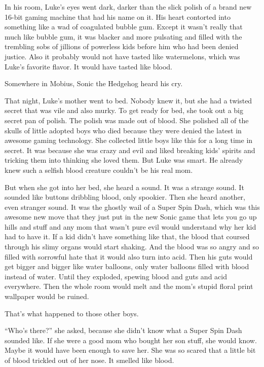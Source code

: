 In his room, Luke's eyes went dark, darker than the slick
polish of a brand new 16-bit gaming machine that had his name on
it. His heart contorted into something like a wad of coagulated
bubble gum. Except it wasn't really that much like bubble
gum, it was blacker and more pulsating and filled with the
trembling sobs of jillions of powerless kids before him who had
been denied justice. Also it probably would not have tasted like
watermelons, which was Luke's favorite flavor. It would have
tasted like blood.



Somewhere in Mobius, Sonic the Hedgehog heard his cry.



That night, Luke's mother went to bed. Nobody knew it, but
she had a twisted secret that was vile and also murky. To get ready
for bed, she took out a big secret pan of polish. The polish was
made out of blood. She polished all of the skulls of little adopted
boys who died because they were denied the latest in awesome gaming
technology. She collected little boys like this for a long time in
secret. It was because she was crazy and evil and liked breaking
kids' spirits and tricking them into thinking she loved them.
But Luke was smart. He already knew such a selfish blood creature
couldn't be his real mom.



But when she got into her bed, she heard a sound. It was a strange
sound. It sounded like buttons dribbling blood, only spookier. Then
she heard another, even stranger sound. It was the ghostly wail of
a Super Spin Dash, which was this awesome new move that they just
put in the new Sonic game that lets you go up hills and stuff and
any mom that wasn't pure evil would understand why her kid
had to have it. If a kid didn't have something like that, the
blood that coursed through his slimy organs would start shaking.
And the blood was so angry and so filled with sorrowful hate that
it would also turn into acid. Then his guts would get bigger and
bigger like water balloons, only water balloons filled with blood
instead of water. Until they exploded, spewing blood and guts and
acid everywhere. Then the whole room would melt and the mom's
stupid floral print wallpaper would be ruined.



That's what happened to those other boys.



``Who's there?'' she asked, because she
didn't know what a Super Spin Dash sounded like. If she were
a good mom who bought her son stuff, she would know. Maybe it would
have been enough to save her. She was so scared that a little bit
of blood trickled out of her nose. It smelled like blood.



